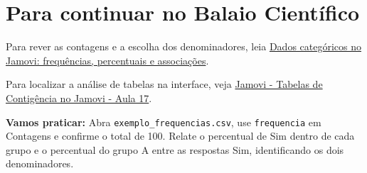 \section{Para continuar no Balaio Científico}

Para rever as contagens e a escolha dos denominadores, leia \href{https://www.balaiocientifico.com/2026/10/dados-categoricos-no-jamovi-frequencias.html}{Dados categóricos no Jamovi: frequências, percentuais e associações}.

Para localizar a análise de tabelas na interface, veja \href{https://www.youtube.com/watch?v=z_NvuE6S14Q}{Jamovi - Tabelas de Contigência no Jamovi - Aula 17}.

\textbf{Vamos praticar:} Abra \texttt{exemplo\_frequencias.csv}, use \texttt{frequencia} em Contagens e confirme o total de 100. Relate o percentual de Sim dentro de cada grupo e o percentual do grupo A entre as respostas Sim, identificando os dois denominadores.
